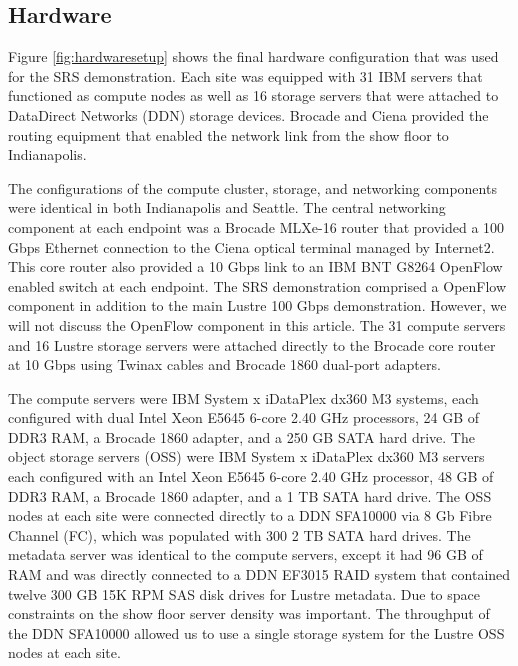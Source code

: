 \documentclass[]{sigplan-proc}
\begin{document}
\subsection{Hardware}\label{sec:hardware}

Figure \ref{fig:hardwaresetup} shows the final hardware configuration that was used for the SRS
demonstration. Each site was equipped with 31 IBM servers that functioned as compute nodes as well as 16
storage servers that were attached to DataDirect Networks (DDN) storage devices. Brocade and Ciena provided
the routing equipment that enabled the network link from the show floor to Indianapolis.

The configurations of the compute cluster, storage, and networking components were identical in both
Indianapolis and Seattle. The central networking component at each endpoint was a Brocade MLXe-16 router that
provided a 100 Gbps Ethernet connection to the Ciena optical terminal managed by Internet2. This core router
also provided a 10 Gbps link to an IBM BNT G8264 OpenFlow enabled switch at each endpoint. The SRS
demonstration comprised a OpenFlow component in addition to the main Lustre 100 Gbps demonstration. However,
we will not discuss the OpenFlow component in this article. The 31 compute servers and 16 Lustre storage
servers were attached directly to the Brocade core router at 10 Gbps using Twinax cables and Brocade 1860
dual-port adapters.

The compute servers were IBM System x iDataPlex dx360 M3 systems, each configured with dual Intel Xeon E5645
6-core 2.40 GHz processors, 24 GB of DDR3 RAM, a Brocade 1860 adapter, and a 250 GB SATA hard drive. The
object storage servers (OSS) were IBM System x iDataPlex dx360 M3 servers each configured with an Intel Xeon
E5645 6-core 2.40 GHz processor, 48 GB of DDR3 RAM, a Brocade 1860 adapter, and a 1 TB SATA hard drive. The
OSS nodes at each site were connected directly to a DDN SFA10000 via 8 Gb Fibre Channel (FC), which was
populated with 300 2 TB SATA hard drives. The metadata server was identical to the compute servers, except it
had 96 GB of RAM and was directly connected to a DDN EF3015 RAID system that contained twelve 300 GB 15K RPM
SAS disk drives for Lustre metadata. Due to space constraints on the show floor server density was
important. The throughput of the DDN SFA10000 allowed us to use a single storage system for the Lustre OSS
nodes at each site.
\end{document}
